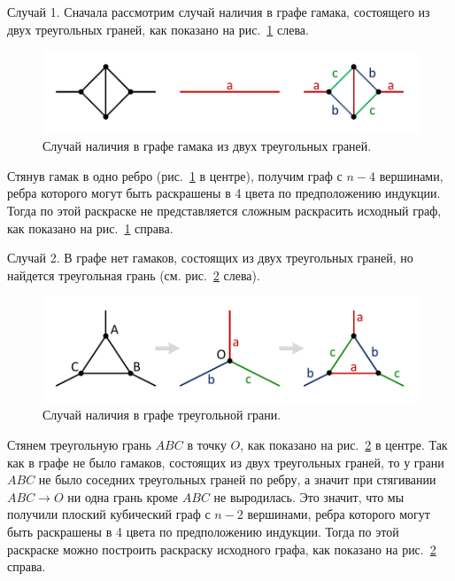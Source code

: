 Случай 1. Сначала рассмотрим случай наличия в графе гамака, состоящего из двух треугольных граней, как показано на рис.~\ref{fig:text_3_graph_prim_coloring4_gamak} слева.

\begin{figure}[ht]
\centering
\includegraphics[width=1.0\textwidth]{./pics/text_3_graph_prim/coloring4_gamak.pdf}
\singlespacing
{}\caption{Случай наличия в графе гамака из двух треугольных граней.}
\label{fig:text_3_graph_prim_coloring4_gamak}
\end{figure}

Стянув гамак в одно ребро (рис.~\ref{fig:text_3_graph_prim_coloring4_gamak} в центре), получим граф с $n - 4$ вершинами, ребра которого могут быть раскрашены в 4 цвета по предположению индукции.
Тогда по этой раскраске не представляется сложным раскрасить исходный граф, как показано на рис.~\ref{fig:text_3_graph_prim_coloring4_gamak} справа.

Случай 2. В графе нет гамаков, состоящих из двух треугольных граней, но найдется треугольная грань (см. рис.~\ref{fig:text_3_graph_prim_coloring4_face3} слева).

\begin{figure}[ht]
\centering
\includegraphics[width=1.0\textwidth]{./pics/text_3_graph_prim/coloring4_face3.pdf}
\singlespacing
{}\caption{Случай наличия в графе треугольной грани.}
\label{fig:text_3_graph_prim_coloring4_face3}
\end{figure}

Стянем треугольную грань $ABC$ в точку $O$, как показано на рис.~\ref{fig:text_3_graph_prim_coloring4_face3} в центре.
Так как в графе не было гамаков, состоящих из двух треугольных граней, то у грани $ABC$ не было соседних треугольных граней по ребру, а значит при стягивании $ABC \rightarrow O$ ни одна грань кроме $ABC$ не выродилась.
Это значит, что мы получили плоский кубический граф с $n - 2$ вершинами, ребра которого могут быть раскрашены в 4 цвета по предположению индукции.
Тогда по этой раскраске можно построить раскраску исходного графа, как показано на рис.~\ref{fig:text_3_graph_prim_coloring4_face3} справа.

